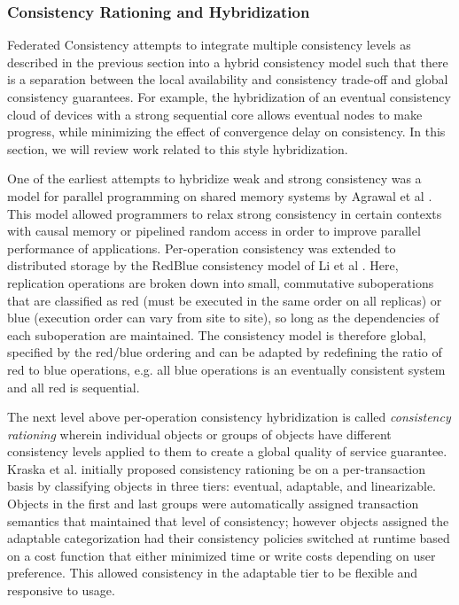 \documentclass{article}
\begin{document}
\subsubsection{Consistency Rationing and Hybridization}
\label{sec:hybridization}

Federated Consistency attempts to integrate multiple consistency levels as described in the previous section into a hybrid consistency model such that there is a separation between the local availability and consistency trade-off and global consistency guarantees. For example, the hybridization of an eventual consistency cloud of devices with a strong sequential core allows eventual nodes to make progress, while minimizing the effect of convergence delay on consistency. In this section, we will review work related to this style hybridization.

One of the earliest attempts to hybridize weak and strong consistency was a model for parallel programming on shared memory systems by Agrawal et al \cite{agrawal_mixed_1994}. This model allowed programmers to relax strong consistency in certain contexts with causal memory or pipelined random access in order to improve parallel performance of applications. Per-operation consistency was extended to distributed storage by the RedBlue consistency model of Li et al \cite{li_making_2012}. Here, replication operations are broken down into small, commutative suboperations that are classified as red (must be executed in the same order on all replicas) or blue (execution order can vary from site to site), so long as the dependencies of each suboperation are maintained. The consistency model is therefore global, specified by the red/blue ordering and can be adapted by redefining the ratio of red to blue operations, e.g. all blue operations is an eventually consistent system and all red is sequential.

The next level above per-operation consistency hybridization is called \textit{consistency rationing} wherein individual objects or groups of objects have different consistency levels applied to them to create a global quality of service guarantee. Kraska et al. \cite{kraska_consistency_2009} initially proposed consistency rationing be on a per-transaction basis by classifying objects in three tiers: eventual, adaptable, and linearizable. Objects in the first and last groups were automatically assigned transaction semantics that maintained that level of consistency; however objects assigned the adaptable categorization had their consistency policies switched at runtime based on a cost function that either minimized time or write costs depending on user preference. This allowed consistency in the adaptable tier to be flexible and responsive to usage.
\end{document}
